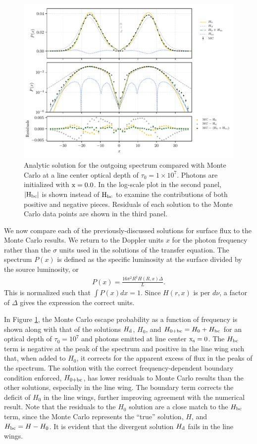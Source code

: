 \documentclass{aastex63}
\newcommand{\be}{\begin{eqnarray}}
\newcommand{\ee}{\end{eqnarray}}
\begin{document}
\begin{figure}
    \centering
    \includegraphics{final_residual.pdf}
    \caption{Analytic solution for the outgoing spectrum compared with Monte Carlo at a line center optical depth of $\tau_0 = 1 \times 10^7$. Photons are initialized with $\rm x = 0.0$. In the log-scale plot in the second panel, $|\rm H_{bc}|$ is shown instead of $\rm H_{bc}$ to examine the contributions of both positive and negative pieces. Residuals of each solution to the Monte Carlo data points are shown in the third panel.} 
    \label{fig:sol_mc_residual_0}
\end{figure}

We now compare each of the previously-discussed solutions for surface flux to the Monte Carlo results. We return to the Doppler units $x$ for the photon frequency rather than the $\sigma$ units used in the solutions of the transfer equation. The spectrum $P(x)$ is defined as the specific luminosity at the surface divided by the source luminosity, or
\be
P(x) = \frac{16\pi^2R^2H(R, x)\Delta}{L}.
\ee
This is normalized such that $\int P(x)dx = 1$. Since $H(r, x)$ is per $d\nu$, a factor of $\Delta$ gives the expression the correct units. 

In Figure \ref{fig:sol_mc_residual_0}, the Monte Carlo escape probability as a function of frequency is shown along with that of the solutions $H_{\rm d}$, $H_0$, and $H_{\rm 0 + bc} = H_0 + H_{\rm bc}$ for an optical depth of $\tau_0 = 10^7$ and photons emitted at line center $\rm x_s = 0$.  The $H_{\rm bc}$ term is negative at the peak of the spectrum and positive in the line wing such that, when added to $H_0$, it corrects for the apparent excess of flux in the peaks of the spectrum. The solution with the correct frequency-dependent boundary condition enforced, $H_{0 + \rm bc}$, has lower residuals to Monte Carlo results than the other solutions, especially in the line wing. The boundary term corrects the deficit of $H_0$ in the line wings, further improving agreement with the numerical result. Note that the residuals to the $H_0$ solution are a close match to the $H_{\rm bc}$ term, since the Monte Carlo represents the ``true'' solution, $H$, and $H_{\rm bc} = H - H_0$. It is evident that the divergent solution $H_{\rm d}$ fails in the line wings.
\end{document}
